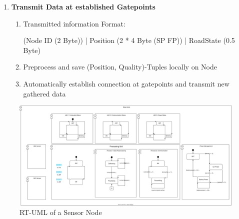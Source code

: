 \begin{enumerate}
    \item \textbf{Transmit Data at established Gatepoints}
       \begin{enumerate}
       \item Transmitted information Format:
       
          (Node ID (2 Byte)) | Position (2 * 4 Byte (SP FP)) | RoadState (0.5 Byte)
       \item Preprocess and save (Position, Quality)-Tuples locally on Node
       \item Automatically establish connection at gatepoints and transmit new gathered data
       \end{enumerate}
    \end{enumerate}
    

\begin{figure}[ht!]
    \centering
    \includegraphics[width=\textwidth]{../../assets/diagrams/edge_node_rtuml/edge_node_rtuml.png}
    \hfill
    \caption{RT-UML of a Sensor Node}
    \label{fig:rt_uml_sensor_node}
\end{figure}